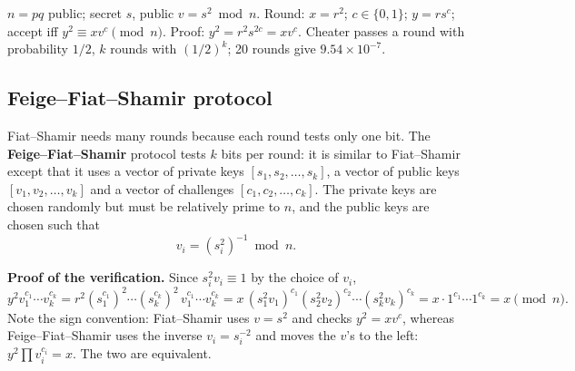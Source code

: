 \begin{mustknow}
$n = pq$ public; secret $s$, public $v = s^2 \bmod n$. Round: $x = r^2$; $c \in \{0, 1\}$; $y = r s^c$; accept iff $y^2 \equiv x v^c \pmod n$. Proof: $y^2 = r^2 s^{2c} = x v^c$. Cheater passes a round with probability $1/2$, $k$ rounds with $(1/2)^k$; 20 rounds give $9.54 \times 10^{-7}$.
\end{mustknow}

\subsection{Feige--Fiat--Shamir protocol \new}

Fiat--Shamir needs many rounds because each round tests only one bit. The \textbf{Feige--Fiat--Shamir} protocol tests $k$ bits per round: it is similar to Fiat--Shamir except that it uses a vector of private keys $[s_1, s_2, \dots, s_k]$, a vector of public keys $[v_1, v_2, \dots, v_k]$ and a vector of challenges $[c_1, c_2, \dots, c_k]$. The private keys are chosen randomly but must be relatively prime to $n$, and the public keys are chosen such that
\[
v_i = (s_i^2)^{-1} \bmod n .
\]
\begin{center}
\end{center}
\textbf{Proof of the verification.} Since $s_i^2 v_i \equiv 1$ by the choice of $v_i$,
\[
y^2 v_1^{c_1} \cdots v_k^{c_k} = r^2 (s_1^{c_1})^2 \cdots (s_k^{c_k})^2\, v_1^{c_1} \cdots v_k^{c_k}
= x\, (s_1^2 v_1)^{c_1} (s_2^2 v_2)^{c_2} \cdots (s_k^2 v_k)^{c_k} = x \cdot 1^{c_1} \cdots 1^{c_k} = x \pmod n .
\]
Note the sign convention: Fiat--Shamir uses $v = s^2$ and checks $y^2 = x v^c$, whereas Feige--Fiat--Shamir uses the inverse $v_i = s_i^{-2}$ and moves the $v$'s to the left: $y^2 \prod v_i^{c_i} = x$. The two are equivalent.

